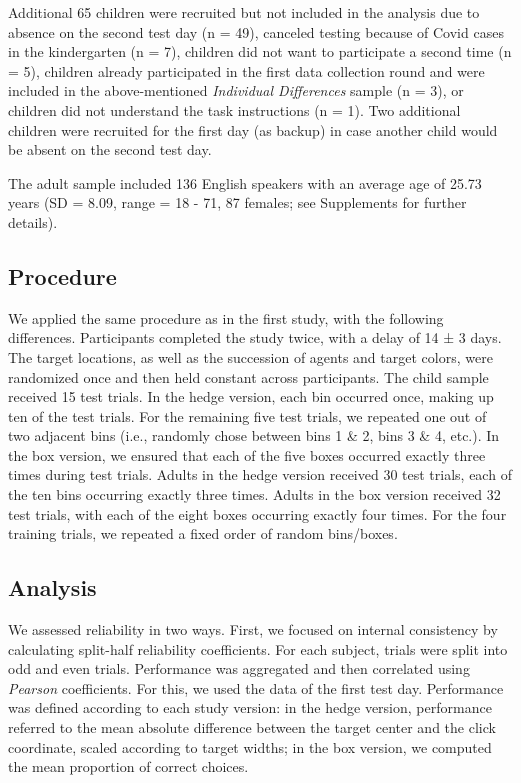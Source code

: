 \documentclass[
  man,floatsintext]{apa6}
\begin{document}
Additional 65 children were recruited but not included in the analysis due to absence on the second test day (n = 49), canceled testing because of Covid cases in the kindergarten (n = 7), children did not want to participate a second time (n = 5), children already participated in the first data collection round and were included in the above-mentioned \emph{Individual Differences} sample (n = 3), or children did not understand the task instructions (n = 1).
Two additional children were recruited for the first day (as backup) in case another child would be absent on the second test day.

The adult sample included 136 English speakers with an average age of 25.73 years (SD = 8.09, range = 18 - 71, 87 females; see Supplements for further details).

\hypertarget{procedure-1}{%
\subsection{Procedure}\label{procedure-1}}

We applied the same procedure as in the first study, with the following differences.
Participants completed the study twice, with a delay of 14 ± 3 days.
The target locations, as well as the succession of agents and target colors, were randomized once and then held constant across participants.
The child sample received 15 test trials.
In the hedge version, each bin occurred once, making up ten of the test trials.
For the remaining five test trials, we repeated one out of two adjacent bins (i.e., randomly chose between bins 1 \& 2, bins 3 \& 4, etc.).
In the box version, we ensured that each of the five boxes occurred exactly three times during test trials.
Adults in the hedge version received 30 test trials, each of the ten bins occurring exactly three times.
Adults in the box version received 32 test trials, with each of the eight boxes occurring exactly four times.
For the four training trials, we repeated a fixed order of random bins/boxes.

\hypertarget{analysis-1}{%
\subsection{Analysis}\label{analysis-1}}

We assessed reliability in two ways.
First, we focused on internal consistency by calculating split-half reliability coefficients.
For each subject, trials were split into odd and even trials.
Performance was aggregated and then correlated using \emph{Pearson} coefficients.
For this, we used the data of the first test day.
Performance was defined according to each study version: in the hedge version, performance referred to the mean absolute difference between the target center and the click coordinate, scaled according to target widths; in the box version, we computed the mean proportion of correct choices.
\end{document}
